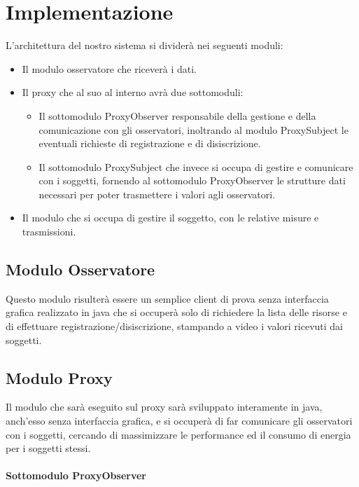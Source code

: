   \section{Implementazione}
    L’architettura del nostro sistema si dividerà nei seguenti moduli:

      \begin{itemize}
        \item Il modulo osservatore che riceverà i dati.
        \item Il proxy che al suo al interno avrà due sottomoduli:

          \begin{itemize}
            \item Il sottomodulo ProxyObserver responsabile della gestione e della comunicazione con gli osservatori, inoltrando al modulo ProxySubject le eventuali richieste di registrazione e di disiscrizione.
            \item Il sottomodulo ProxySubject che invece si occupa di gestire e comunicare con i soggetti, fornendo al sottomodulo ProxyObserver le strutture dati necessari per poter trasmettere i valori agli osservatori.
          \end{itemize}

        \item Il modulo che si occupa di gestire il soggetto, con le relative misure e trasmissioni.

      \end{itemize}
    \subsection{Modulo Osservatore}
      Questo modulo risulterà essere un semplice client di prova senza interfaccia grafica realizzato in java che si occuperà solo di richiedere la lista delle risorse e di effettuare registrazione/disiscrizione, stampando a video i valori ricevuti dai soggetti.

    \subsection{Modulo Proxy}
      Il modulo che sarà eseguito sul proxy sarà sviluppato interamente in java, anch’esso senza interfaccia grafica, e si occuperà di far comunicare gli osservatori con i soggetti, cercando di massimizzare le performance ed il consumo di energia per i soggetti stessi.

      \paragraph{Sottomodulo ProxyObserver}

